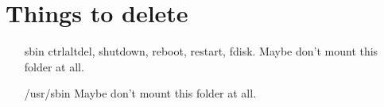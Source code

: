 \documentclass[a4paper]{article}
\begin{document}
\section{Things to delete}
\begin{itemize}
\item[sbin] ctrlaltdel, shutdown, reboot, restart, fdisk. Maybe don't mount this folder at all.
\item[/usr/sbin] Maybe don't mount this folder at all.
\end{itemize}
\end{document}
